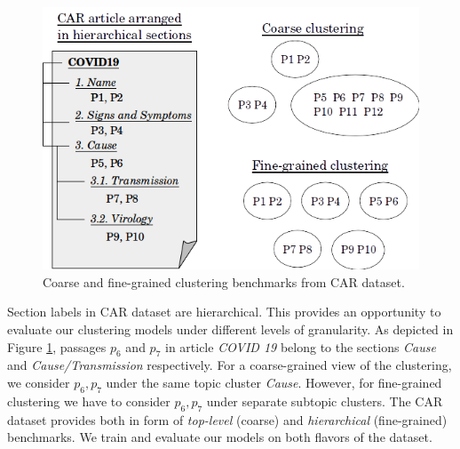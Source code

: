 \documentclass[11pt,a4paper]{article}
\begin{document}
\begin{figure}[t]
    \centering
    \includegraphics[scale=0.5]{acl-ijcnlp2021-templates/wiki_articles.png}
    \caption{Coarse and fine-grained clustering benchmarks from CAR dataset.}
    \label{fig:wiki}
\end{figure}

Section labels in CAR dataset are hierarchical. This provides an opportunity to evaluate our clustering models under different levels of granularity. As depicted in Figure \ref{fig:wiki}, passages $p_6$ and $p_7$ in article \textit{COVID 19}  belong to the sections \textit{Cause} and \textit{Cause/Transmission} respectively. For a coarse-grained view of the clustering, we consider $p_6,p_7$ under the same topic cluster \textit{Cause}. However, for fine-grained clustering we have to consider $p_6,p_7$ under separate subtopic clusters. The CAR dataset provides both in form of \textit{top-level} (coarse) and \textit{hierarchical} (fine-grained) benchmarks. We train and evaluate our models on both flavors of the dataset.

\end{document}
